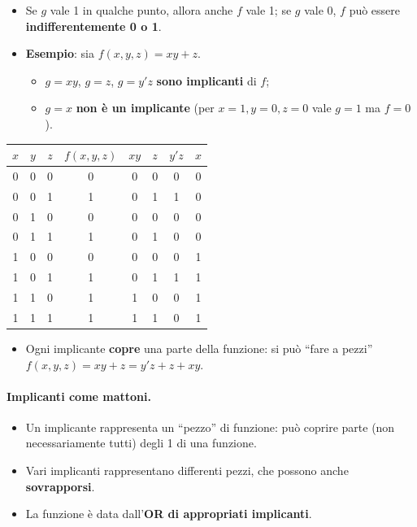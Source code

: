 \documentclass[12pt, a4paper]{article}
\begin{document}
\begin{itemize}
    \item Se $g$ vale 1 in qualche punto, allora anche $f$ vale 1; se $g$ vale 0, $f$ può essere \textbf{indifferentemente 0 o 1}.
    \item \textbf{Esempio}: sia $f(x,y,z) = xy + z$.
    \begin{itemize}
        \item $g = xy$, $g = z$, $g = y'z$ \textcolor{green!50!black}{\textbf{sono implicanti}} di $f$;
        \item $g = x$ \textcolor{red!80!black}{\textbf{non è un implicante}} (per $x=1, y=0, z=0$ vale $g = 1$ ma $f = 0$).
    \end{itemize}
\end{itemize}

\begin{center}
\renewcommand{\arraystretch}{1.25}
\begin{tabular}[t]{|ccc||c||ccc|c|}
\hline
\colorbox{gray!25}{\color{black}$x$} & \colorbox{gray!25}{\color{black}$y$} & \colorbox{gray!25}{\color{black}$z$} & \colorbox{gray!25}{\color{black}$f(x,y,z)$} & \colorbox{gray!25}{\color{black}$xy$} & \colorbox{gray!25}{\color{black}$z$} & \colorbox{gray!25}{\color{black}$y'z$} & \colorbox{gray!25}{\color{black}$x$} \\ \hline
0 & 0 & 0 & 0 & 0 & 0 & 0 & 0 \\ \hline
0 & 0 & 1 & 1 & 0 & 1 & 1 & 0 \\ \hline
0 & 1 & 0 & 0 & 0 & 0 & 0 & 0 \\ \hline
0 & 1 & 1 & 1 & 0 & 1 & 0 & 0 \\ \hline
1 & 0 & 0 & 0 & 0 & 0 & 0 & 1 \\ \hline
1 & 0 & 1 & 1 & 0 & 1 & 1 & 1 \\ \hline
1 & 1 & 0 & 1 & 1 & 0 & 0 & 1 \\ \hline
1 & 1 & 1 & 1 & 1 & 1 & 0 & 1 \\ \hline
\end{tabular}
\end{center}

\begin{itemize}
    \item Ogni implicante \textbf{copre} una parte della funzione: si può ``fare a pezzi'' $f(x,y,z) = xy + z = y'z + z + xy$.
\end{itemize}

\paragraph{Implicanti come mattoni.}
\begin{itemize}
    \item Un implicante rappresenta un ``pezzo'' di funzione: può coprire parte (non necessariamente tutti) degli 1 di una funzione.
    \item Vari implicanti rappresentano differenti pezzi, che possono anche \textbf{sovrapporsi}.
    \item La funzione è data dall'\textbf{OR di appropriati implicanti}.
\end{itemize}
\end{document}
